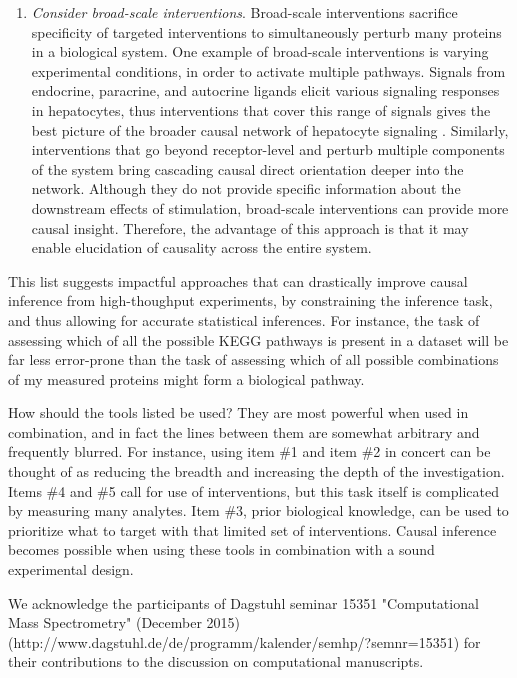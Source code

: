 \documentclass[journal=jacsat,manuscript=article]{achemso}
\begin{document}
\begin{enumerate}
\item \textit{Consider broad-scale interventions}. Broad-scale interventions sacrifice specificity of targeted interventions to simultaneously perturb many proteins in a biological system. One example of broad-scale interventions is varying experimental conditions, in order to activate multiple pathways.  Signals from endocrine, paracrine, and autocrine ligands elicit various signaling responses in hepatocytes, thus interventions that cover this range of signals gives the best picture of the broader causal network of hepatocyte signaling \cite{alexopoulos2010networks}. Similarly, interventions that go beyond receptor-level and perturb multiple components of the system bring cascading causal direct orientation deeper into the network.  Although they do not provide specific information about the downstream effects of stimulation,  broad-scale interventions can provide more causal insight. Therefore, the advantage of this approach is that it may enable elucidation of  causality across the entire system.

\end{enumerate}

This list suggests impactful approaches that can drastically improve causal inference from high-thoughput experiments, by constraining the inference task, and thus allowing for accurate
statistical inferences. For instance, the task of assessing which of all
the possible KEGG pathways is present in a dataset will be far less
error-prone than the task of assessing which of all possible
combinations of my measured proteins might form a biological pathway.

How should the tools listed be used? They are most powerful when used in
combination, and in fact the lines between them are somewhat arbitrary
and frequently blurred. For instance, using item \#1 and item \#2 in
concert can be thought of as reducing the breadth and increasing the
depth of the investigation. Items \#4 and \#5 call for use of
interventions, but this task itself is complicated by measuring many
analytes. Item
\#3, prior biological knowledge, can be used to prioritize what to
target with that limited set of interventions.  Causal inference becomes possible when using these tools in combination with a sound experimental design.

\begin{acknowledgement}
We acknowledge the participants of Dagstuhl seminar 15351 "Computational Mass Spectrometry" (December 2015) (http://www.dagstuhl.de/de/programm/kalender/semhp/?semnr=15351) for their contributions to the discussion on computational manuscripts.
\end{acknowledgement}

\end{document}
